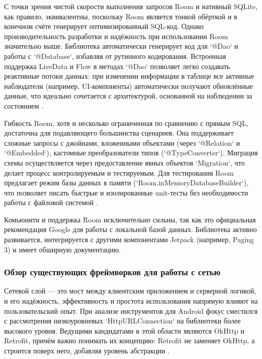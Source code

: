 С точки зрения чистой скорости выполнения запросов Room и нативный SQLite, как правило, эквивалентны, поскольку Room является тонкой обёрткой и в конечном счёте генерирует оптимизированный SQL-код. Однако производительность разработки и надёжность при использовании Room значительно выше. Библиотека автоматически генерирует код для `@Dao` и работы с `@Database`, избавляя от рутинного кодирования. Встроенная поддержка LiveData и Flow в методах `@Dao` позволяет легко создавать реактивные потоки данных: при изменении информации в таблице все активные наблюдатели (например, UI-компоненты) автоматически получают обновлённые данные, что идеально сочетается с архитектурой, основанной на наблюдении за состоянием \cite{reff}.

Гибкость Room, хотя и несколько ограниченная по сравнению с прямым SQL, достаточна для подавляющего большинства сценариев. Она поддерживает сложные запросы с джойнами, вложенными объектами (через `@Relation` и `@Embedded`), кастомные преобразователи типов (`@TypeConverter`). Миграция схемы осуществляется через предоставление явных объектов `Migration`, что делает процесс контролируемым и тестируемым. Для тестирования Room предлагает режим базы данных в памяти (`Room.inMemoryDatabaseBuilder`), что позволяет писать быстрые и изолированные unit-тесты без необходимости работы с файловой системой \cite{reff}.

Комьюнити и поддержка Room исключительно сильны, так как это официальная рекомендация Google для работы с локальной базой данных. Библиотека активно развивается, интегрируется с другими компонентами Jetpack (например, Paging 3) и имеет обширную документацию.

\subsubsection{Обзор существующих фреймворков для работы с сетью}

Сетевой слой — это мост между клиентским приложением и серверной логикой, и его надёжность, эффективность и простота использования напрямую влияют на пользовательский опыт. При анализе инструментов для Android фокус сместился с рассмотрения низкоуровневых `HttpURLConnection` на библиотеки более высокого уровня. Ведущими кандидатами в этой области являются OkHttp и Retrofit, причём важно понимать их концепцию: Retrofit не заменяет OkHttp, а строится поверх него, добавляя уровень абстракции \cite{refg}.

